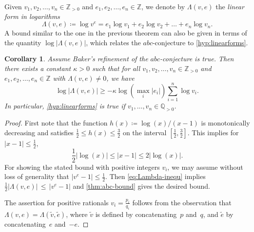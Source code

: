 \documentclass[10pt,a4paper]{article}
\newtheorem{corollary}[theorem]{Corollary}
\theoremstyle{definition}
\newcommand{\QQ}{\mathbb{Q}}
\newcommand{\ZZ}{\mathbb{Z}}
\numberwithin{equation}{section}
\begin{document}
Given $v_1,v_2,\dots,v_n\in\ZZ_{>0}$ and $e_1,e_2,\dots,e_n\in\ZZ$,
we denote by $\Lambda(v,e)$ the \textit{linear form in logarithms}
\begin{equation}\label{eq:DEF-Lambda}
 \Lambda(v,e)\coloneqq \log v^e = e_1 \log v_1 + e_2 \log v_2 +\dots +e_n \log v_n.
\end{equation}
A bound similar to the one in the previous theorem can also be given in terms of the quantity
$\log|\Lambda(v,e)|$, which relates the $abc$-conjecture to \cref{hyp:linearforms}.

\begin{corollary}\label{cor:abc-bound-log}
Assume Baker's refinement of the $abc$-conjecture is true.
Then there exists a constant $\kappa>0$ such that for all
$v_1,v_2,\dots,v_n\in\ZZ_{>0}$ and $e_1,e_2,\dots,e_n\in\ZZ$ with $\Lambda(v,e)\neq 0$,
we have
\[
 \log|\Lambda(v,e)|\geq -\kappa\log(\max_i |e_i|)\sum_{i=1}^n \log v_i.
\]
In particular, \cref{hyp:linearforms} is true if $v_1,\ldots, v_n\in\QQ_{>0}$.
\end{corollary}

\begin{proof}
First note that the function $h(x)\coloneqq \log(x)/(x-1)$ is monotonically decreasing
and satisfies
$\frac12 \le h(x) \le \frac32$
on the interval $[\frac12,\frac32]$.
This implies for $|x-1| \le \frac12$,
\begin{equation}\label{eq:Lambda-inequ}
    \frac{1}{2} |\log(x)| \leq |x-1| \leq 2 |\log(x)|.
\end{equation}
For showing the stated bound with positive integers $v_i$,
we may assume without loss of generality that $|v^e-1|\leq \frac{1}{2}$.
Then \cref{eq:Lambda-inequ} implies
$\frac{1}{2}|\Lambda(v,e)| \, \leq \, |v^e-1|$
and \cref{thm:abc-bound} gives the desired bound.

The assertion for positive rationals $v_i = \frac{p_i}{q_i}$ follows from
the observation that
$\Lambda(v,e) = \Lambda(\tilde v,\tilde e)$, where $\tilde v$ is defined by concatenating~$p$ and~$q$, and $\tilde e$ by concatenating~$e$ and~$-e$.
\end{proof}
\end{document}
